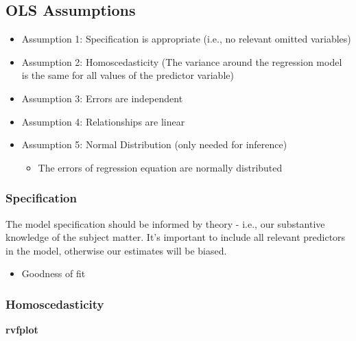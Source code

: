 \documentclass[]{book}
\newenvironment{Shaded}{\begin{snugshade}}{\end{snugshade}}
\newcommand{\KeywordTok}[1]{\textcolor[rgb]{0.13,0.29,0.53}{\textbf{#1}}}
\providecommand{\tightlist}{%
  \setlength{\itemsep}{0pt}\setlength{\parskip}{0pt}}
\begin{document}
\hypertarget{ols-assumptions}{%
\subsection{OLS Assumptions}\label{ols-assumptions}}

\begin{itemize}
\tightlist
\item
  Assumption 1: Specification is appropriate (i.e., no relevant omitted variables)
\item
  Assumption 2: Homoscedasticity (The variance around the regression model is the same for all values of the predictor variable)
\item
  Assumption 3: Errors are independent
\item
  Assumption 4: Relationships are linear
\item
  Assumption 5: Normal Distribution (only needed for inference)

  \begin{itemize}
  \tightlist
  \item
    The errors of regression equation are normally distributed
  \end{itemize}
\end{itemize}

\hypertarget{specification}{%
\subsubsection{Specification}\label{specification}}

The model specification should be informed by theory - i.e., our substantive knowledge of the subject matter.
It's important to include all relevant predictors in the model, otherwise our estimates will be biased.

\begin{itemize}
\tightlist
\item
  Goodness of fit
\end{itemize}

\hypertarget{homoscedasticity}{%
\subsubsection{Homoscedasticity}\label{homoscedasticity}}

\begin{Shaded}
\begin{Highlighting}[]
  \KeywordTok{rvfplot}
\end{Highlighting}
\end{Shaded}
\end{document}
